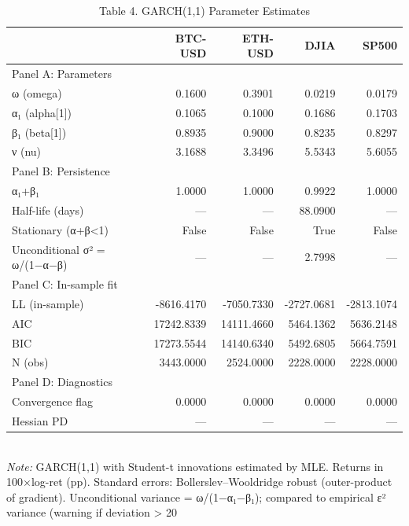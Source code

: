 \begin{table}[ht]
\centering
\caption{Table 4. GARCH(1,1) Parameter Estimates}
\label{tab:garch_est}
\begin{tabular}{lrrrr}
\toprule
 & BTC-USD & ETH-USD & DJIA & SP500 \\
\midrule
Panel A: Parameters &  &  &  &  \\
ω (omega) & 0.1600 & 0.3901 & 0.0219 & 0.0179 \\
α₁ (alpha[1]) & 0.1065 & 0.1000 & 0.1686 & 0.1703 \\
β₁ (beta[1]) & 0.8935 & 0.9000 & 0.8235 & 0.8297 \\
ν (nu) & 3.1688 & 3.3496 & 5.5343 & 5.6055 \\
Panel B: Persistence &  &  &  &  \\
α₁+β₁ & 1.0000 & 1.0000 & 0.9922 & 1.0000 \\
Half-life (days) & — & — & 88.0900 & — \\
Stationary (α+β<1) & False & False & True & False \\
Unconditional σ² = ω/(1−α−β) & — & — & 2.7998 & — \\
Panel C: In-sample fit &  &  &  &  \\
LL (in-sample) & -8616.4170 & -7050.7330 & -2727.0681 & -2813.1074 \\
AIC & 17242.8339 & 14111.4660 & 5464.1362 & 5636.2148 \\
BIC & 17273.5544 & 14140.6340 & 5492.6805 & 5664.7591 \\
N (obs) & 3443.0000 & 2524.0000 & 2228.0000 & 2228.0000 \\
Panel D: Diagnostics &  &  &  &  \\
Convergence flag & 0.0000 & 0.0000 & 0.0000 & 0.0000 \\
Hessian PD & — & — & — & — \\
\bottomrule
\end{tabular}
\\[3pt]\footnotesize\textit{Note:} GARCH(1,1) with Student-t innovations estimated by MLE. Returns in 100×log-ret (pp). Standard errors: Bollerslev–Wooldridge robust (outer-product of gradient). Unconditional variance = ω/(1−α₁−β₁); compared to empirical ε² variance (warning if deviation > 20%
\end{table}